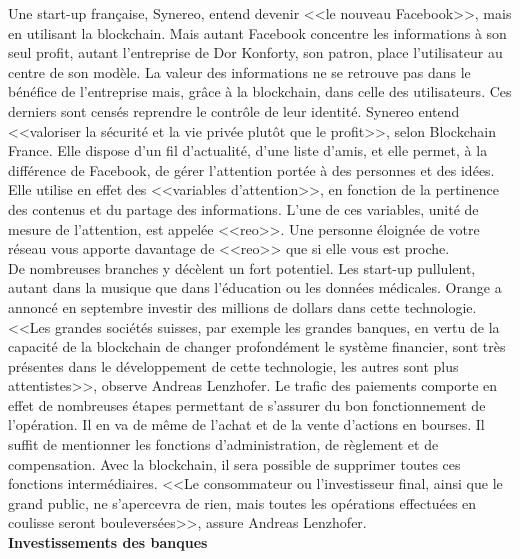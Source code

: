 \documentclass[11pt,twoside,a4paper]{article}
\begin{document}
Une start-up fran\c{c}aise, Synereo, entend devenir <<le nouveau Facebook>>, mais en utilisant la blockchain. Mais autant Facebook concentre les informations {\`a} son seul profit, autant l'entreprise de Dor Konforty, son patron, place l'utilisateur au centre de son mod{\`e}le. La valeur des informations ne se retrouve pas dans le b{\'e}n{\'e}fice de l'entreprise mais, gr{\^a}ce {\`a} la blockchain, dans celle des utilisateurs. Ces derniers sont cens{\'e}s reprendre le contr{\^o}le de leur identit{\'e}. Synereo entend <<valoriser la s{\'e}curit{\'e} et la vie priv{\'e}e plut{\^o}t que le profit>>, selon Blockchain France. Elle dispose d'un fil d'actualit{\'e}, d'une liste d'amis, et elle permet, {\`a} la diff{\'e}rence de Facebook, de g{\'e}rer l'attention port{\'e}e {\`a} des personnes et des id{\'e}es. Elle utilise en effet des <<variables d'attention>>, en fonction de la pertinence des contenus et du partage des informations. L'une de ces variables, unit{\'e} de mesure de l'attention, est appel{\'e}e <<reo>>. Une personne {\'e}loign{\'e}e de votre r{\'e}seau vous apporte davantage de <<reo>> que si elle vous est proche. ~\\

De nombreuses branches y d{\'e}c{\`e}lent un fort potentiel. Les start-up pullulent, autant dans la musique que dans l'{\'e}ducation ou les donn{\'e}es m{\'e}dicales. Orange a annonc{\'e} en septembre investir des millions de dollars dans cette technologie. ~\\

<<Les grandes soci{\'e}t{\'e}s suisses, par exemple les grandes banques, en vertu de la capacit{\'e} de la blockchain de changer profond{\'e}ment le syst{\`e}me financier, sont tr{\`e}s pr{\'e}sentes dans le d{\'e}veloppement de cette technologie, les autres sont plus attentistes>>, observe Andreas Lenzhofer. Le trafic des paiements comporte en effet de nombreuses {\'e}tapes permettant de s'assurer du bon fonctionnement de l'op{\'e}ration. Il en va de m{\^e}me de l'achat et de la vente d'actions en bourses. Il suffit de mentionner les fonctions d'administration, de r{\`e}glement et de compensation. Avec la blockchain, il sera possible de supprimer toutes ces fonctions interm{\'e}diaires. <<Le consommateur ou l'investisseur final, ainsi que le grand public, ne s'apercevra de rien, mais toutes les op{\'e}rations effectu{\'e}es en coulisse seront boulevers{\'e}es>>, assure Andreas Lenzhofer. ~\\

\textbf{Investissements des banques}~\\
\end{document}
